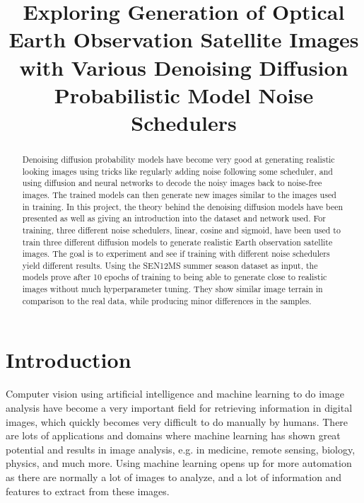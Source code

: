 \documentclass[fullpaper]{nldl}
\title{Exploring Generation of Optical Earth Observation Satellite Images with Various Denoising Diffusion Probabilistic Model Noise Schedulers}
\begin{document}
\maketitle

\begin{abstract}
Denoising diffusion probability models have become very good at generating realistic looking images using tricks like regularly adding noise following some scheduler, and using diffusion and neural networks to decode the noisy images back to noise-free images. The trained models can then generate new images similar to the images used in training. In this project, the theory behind the denoising diffusion models have been presented as well as giving an introduction into the dataset and network used. For training, three different noise schedulers, linear, cosine and sigmoid, have been used to train three different diffusion models to generate realistic Earth observation satellite images. The goal is to experiment and see if training with different noise schedulers yield different results. Using the SEN12MS summer season dataset as input, the models prove after 10 epochs of training to being able to generate close to realistic images without much hyperparameter tuning. They show similar image terrain in comparison to the real data, while producing minor differences in the samples.
\end{abstract}


\section{Introduction}
\label{sect:Intro}
Computer vision using artificial intelligence and machine learning to do image analysis have become a very important field for retrieving information in digital images, which quickly becomes very difficult to do manually by humans. There are lots of applications and domains where machine learning has shown great potential and results in image analysis, e.g. in medicine, remote sensing, biology, physics, and much more. Using machine learning opens up for more automation as there are normally a lot of images to analyze, and a lot of information and features to extract from these images.
\end{document}
